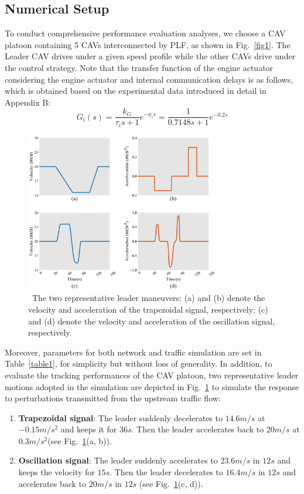 \documentclass[journal]{IEEEtran}
\begin{document}
\subsection{Numerical Setup}
\label{Section 5.1}

To conduct comprehensive performance evaluation analyses, we choose a CAV platoon containing 5 CAVs interconnected by PLF, as shown in Fig.~\ref{fig1}. The Leader CAV drives under a given speed profile while the other CAVs drive under the control strategy. Note that the transfer function of the engine actuator considering the engine actuator and internal communication delays is as follows, which is obtained based on the experimental data introduced in detail in Appendix B:
\begin{equation}
  G_i(s)=\frac{k_G}{\tau_is+1}e^{-\phi_is}=\frac{1}{0.7148s+1}e^{-0.2s}
  \label{eq51}
\end{equation}

\begin{figure}

  \centering
  \includegraphics[width=8.5cm]{figs/fig2.png}
  \caption{~The two representative leader maneuvers: (a) and (b) denote the velocity and acceleration of the trapezoidal signal, respectively; (c) and (d) denote the velocity and acceleration of the oscillation signal, respectively.}
  \label{fig2}

\end{figure}

Moreover, parameters for both network and traffic simulation are set in Table~\ref{table1}, for simplicity but without loss of generality. In addition, to evaluate the tracking performances of the CAV platoon, two representative leader motions adopted in the simulation are depicted in Fig.~\ref{fig2} to simulate the response to perturbations transmitted from the upstream traffic flow:
\begin{enumerate}
  \item \textbf{Trapezoidal signal}: The leader suddenly decelerates to $14.6m/s$ at $ - 0.15m/{s^2}$ and keeps it for $36s$. Then the leader accelerates back to $20m/s$ at $ 0.3m/{s^2} $(see Fig.~\ref{fig2}(a, b)).
  \item \textbf{Oscillation signal}: The leader suddenly accelerates to $23.6m/s$ in $12s$ and keeps the velocity for $15s$. Then the leader decelerates to $16.4m/s$ in $12s$ and accelerates back to $20m/s$ in $12s$ (see Fig.~\ref{fig2}(c, d)).
\end{enumerate}
\end{document}

